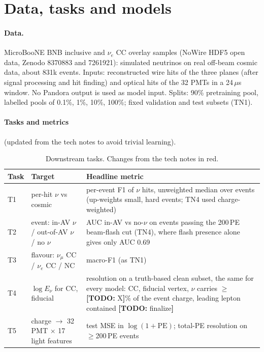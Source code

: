 \documentclass[11pt,a4paper]{article}
\newcommand{\todo}[1]{{\color{plan}\textbf{[TODO:} #1\textbf{]}}}
\newcommand{\nue}{\ensuremath{\nu_e}}
\newcommand{\numu}{\ensuremath{\nu_\mu}}
\begin{document}
\section{Data, tasks and models}\label{sec:setup}
\paragraph{Data.} MicroBooNE BNB inclusive and \nue{} CC overlay samples (NoWire HDF5 open data, Zenodo 8370883 and 7261921): simulated neutrinos on real off-beam cosmic data, about 831k events. Inputs: reconstructed wire hits of the three planes (after signal processing and hit finding) and optical hits of the 32 PMTs in a 24\,$\mu$s window. No Pandora output is used as model input. Splits: 90\% pretraining pool, labelled pools of 0.1\%, 1\%, 10\%, 100\%; fixed validation and test subsets (TN1).

\paragraph{Tasks and metrics} {\color{plan}(updated from the tech notes to avoid trivial learning)}.
\begin{table}[H]\centering\footnotesize
\caption{Downstream tasks. {\color{plan}Changes from the tech notes in red.}}\label{tab:tasks}
\begin{tabularx}{\textwidth}{lLL}\toprule
Task & Target & Headline metric\\\midrule
T1 & per-hit $\nu$ vs cosmic & {\color{plan}per-event F1 of $\nu$ hits, unweighted median over events} (up-weights small, hard events; TN4 used charge-weighted)\\
T2 & event: in-AV $\nu$ / out-of-AV $\nu$ / no $\nu$ & {\color{plan}AUC in-AV vs no-$\nu$ on events passing the 200\,PE beam-flash cut} (TN4), where flash presence alone gives only AUC 0.69\\
T3 & flavour: \numu{} CC / \nue{} CC / NC & macro-F1 (as TN1)\\
T4 & $\log E_\nu$ for CC, fiducial & {\color{plan}resolution on a truth-based clean subset, the same for every model}: CC, fiducial vertex, $\nu$ carries $\geq$\todo{X}\% of the event charge, leading lepton contained \todo{finalize}\\
T5 & charge $\to$ 32 PMT $\times$ 17 light features & test MSE in $\log(1+\mathrm{PE})$; total-PE resolution on $\geq$200\,PE events\\
\bottomrule\end{tabularx}
\end{table}
\end{document}
